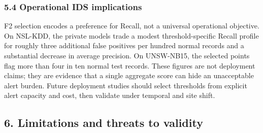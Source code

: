 \documentclass[11pt,a4paper]{article}
\begin{document}
\hypertarget{operational-ids-implications}{%
\subsubsection{5.4 Operational IDS
implications}\label{operational-ids-implications}}

F2 selection encodes a preference for Recall, not a universal
operational objective. On NSL-KDD, the private models trade a modest
threshold-specific Recall profile for roughly three additional false
positives per hundred normal records and a substantial decrease in
average precision. On UNSW-NB15, the selected points flag more than four
in ten normal test records. These figures are not deployment claims;
they are evidence that a single aggregate score can hide an unacceptable
alert burden. Future deployment studies should select thresholds from
explicit alert capacity and cost, then validate under temporal and site
shift.

\hypertarget{limitations-and-threats-to-validity}{%
\subsection{6. Limitations and threats to
validity}\label{limitations-and-threats-to-validity}}
\end{document}
